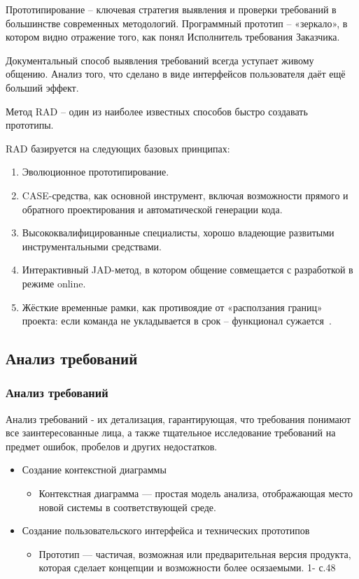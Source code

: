 \documentclass{../industrial-development}
\begin{document}
Прототипирование – ключевая стратегия выявления и проверки требований в большинстве современных методологий. Программный прототип –
«зеркало», в котором видно отражение того, как понял Исполнитель требования Заказчика. 

Документальный способ выявления требований
всегда уступает живому общению. Анализ того, что сделано в виде интерфейсов пользователя даёт ещё больший эффект. 

Метод RAD – один из наиболее известных способов быстро создавать прототипы.

RAD базируется на следующих базовых принципах:
\begin{enumerate}
\item Эволюционное прототипирование.
\item CASE-средства, как основной инструмент, включая возможности прямого и
обратного проектирования и автоматической генерации кода.
\item Высококвалифицированные специалисты, хорошо владеющие развитыми
инструментальными средствами.
\item Интерактивный JAD-метод, в котором общение совмещается с разработкой
в режиме online.
\item Жёсткие временные рамки, как противоядие от «расползания границ» проекта: если команда не укладывается в срок – функционал сужается~\cite[с.~33--34]{Maglinec}.
\end{enumerate}


\subsection{Анализ требований}
\begin{frame} \frametitle{Анализ требований}
  \begin{block}{}
   \alert{Анализ требований} - их детализация, гарантирующая, что требования понимают все заинтересованные лица, а также тщательное исследование требований на предмет ошибок, пробелов и других недостатков.
  \end{block}

	
\begin{itemize}

\item \alert{Создание контекстной диаграммы} 

\begin{itemize}
\item Контекстная диаграмма — простая модель анализа, отображающая место новой системы в соответствующей среде.
\end{itemize}

\item \alert{Создание пользовательского интерфейса и технических прототипов} 

\begin{itemize}
\item Прототип — частичая, возможная или предварительная версия продукта, которая сделает концепции и возможности более осязаемыми. 1- с.48
\end{itemize}

\end{itemize}

\end{frame}
\end{document}
